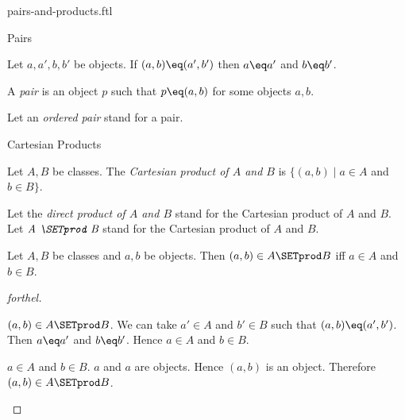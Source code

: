 \documentclass{naproche-library}
\begin{document}
\begin{smodule}[title=Ordered Pairs and Cartesian Products]{pairs-and-products.ftl}

\begin{sfragment}{Pairs}
  \begin{axiom}[forthel,id=FOUNDATIONS_04_8464577431863296]
    Let $a, a', b, b'$ be objects.
    If $(a, b) \eq (a', b')$ then $a \eq a'$ and $b \eq b'$.
  \end{axiom}

  \begin{definition}[forthel,id=FOUNDATIONS_04_4782386822774784]
    A \emph{pair} is an object $p$ such that $p \eq (a, b)$ for some objects $a, b$.

    Let an \emph{ordered pair} stand for a pair.
  \end{definition}
\end{sfragment}

\begin{sfragment}{Cartesian Products}
  \begin{definition}[forthel,id=FOUNDATIONS_04_2877806274936832]
    Let $A, B$ be classes.
    The \emph{Cartesian product of $A$ and $B$} is $\{ (a, b) \mid a \in A$ and $b \in B \}$.

    Let the \emph{direct product of $A$ and $B$} stand for  the Cartesian product of $A$ and $B$.
    Let $\emph{A \SETprod B}$ stand for the Cartesian product of $A$ and $B$.
  \end{definition}

  \begin{proposition}[forthel,id=FOUNDATIONS_04_1581118511906816]
    Let $A, B$ be classes and $a, b$ be objects.
    Then $(a, b) \in A \SETprod B$ iff $a \in A$ and $b \in B$.
  \end{proposition}
  \begin{proof}[forthel]
    \begin{case}{$(a, b) \in A \SETprod B$.}
      We can take $a' \in A$ and $b' \in B$ such that $(a, b) \eq (a', b')$.
      Then $a \eq a'$ and $b \eq b'$.
      Hence $a \in A$ and $b \in B$.
    \end{case}

    \begin{case}{$a \in A$ and $b \in B$.}
      $a$ and $a$ are objects.
      Hence $(a, b)$ is an object.
      Therefore $(a, b) \in A \SETprod B$.
    \end{case}
  \end{proof}


\end{sfragment}
\end{smodule}
\end{document}
